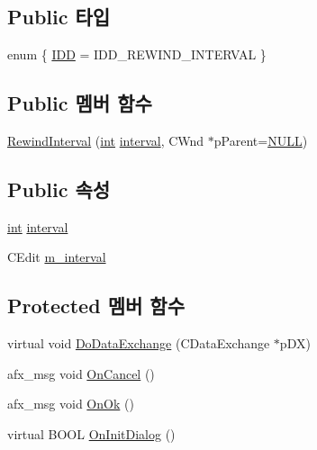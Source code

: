 \subsection*{Public 타입}
\begin{DoxyCompactItemize}
\item 
enum \{ \mbox{\hyperlink{class_rewind_interval_aea74dcd9cfdb01eab907a1e6a633786fa422d7fb0e0b5b81c5e1681c417ea1963}{I\+DD}} = I\+D\+D\+\_\+\+R\+E\+W\+I\+N\+D\+\_\+\+I\+N\+T\+E\+R\+V\+AL
 \}
\end{DoxyCompactItemize}
\subsection*{Public 멤버 함수}
\begin{DoxyCompactItemize}
\item 
\mbox{\hyperlink{class_rewind_interval_abf63f08752f596ac0fa23b5cc75705ef}{Rewind\+Interval}} (\mbox{\hyperlink{_util_8cpp_a0ef32aa8672df19503a49fab2d0c8071}{int}} \mbox{\hyperlink{class_rewind_interval_a3bf155d8d02f9b48cfb2c521fbd05c10}{interval}}, C\+Wnd $\ast$p\+Parent=\mbox{\hyperlink{_system_8h_a070d2ce7b6bb7e5c05602aa8c308d0c4}{N\+U\+LL}})
\end{DoxyCompactItemize}
\subsection*{Public 속성}
\begin{DoxyCompactItemize}
\item 
\mbox{\hyperlink{_util_8cpp_a0ef32aa8672df19503a49fab2d0c8071}{int}} \mbox{\hyperlink{class_rewind_interval_a3bf155d8d02f9b48cfb2c521fbd05c10}{interval}}
\item 
C\+Edit \mbox{\hyperlink{class_rewind_interval_a67355ee1278bb5827beca804a2e2fcb5}{m\+\_\+interval}}
\end{DoxyCompactItemize}
\subsection*{Protected 멤버 함수}
\begin{DoxyCompactItemize}
\item 
virtual void \mbox{\hyperlink{class_rewind_interval_a5edc01838b4b72a8aef111e9c1103d1b}{Do\+Data\+Exchange}} (C\+Data\+Exchange $\ast$p\+DX)
\item 
afx\+\_\+msg void \mbox{\hyperlink{class_rewind_interval_a8aecd163bdd5ac7472b24976de094fcc}{On\+Cancel}} ()
\item 
afx\+\_\+msg void \mbox{\hyperlink{class_rewind_interval_a1375930198e073532314da8b6ed40286}{On\+Ok}} ()
\item 
virtual B\+O\+OL \mbox{\hyperlink{class_rewind_interval_ad108898e1ce2a68db6e1478225e8f842}{On\+Init\+Dialog}} ()
\end{DoxyCompactItemize}


